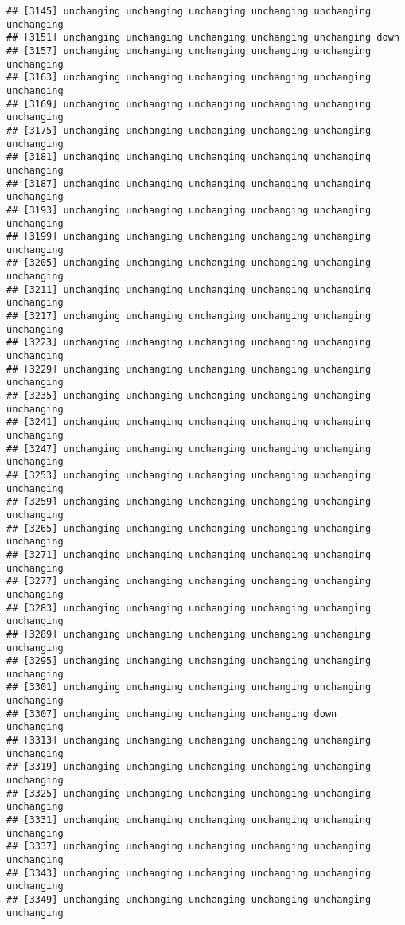 \documentclass[]{article}
\begin{document}
\begin{verbatim}
## [3145] unchanging unchanging unchanging unchanging unchanging unchanging
## [3151] unchanging unchanging unchanging unchanging unchanging down      
## [3157] unchanging unchanging unchanging unchanging unchanging unchanging
## [3163] unchanging unchanging unchanging unchanging unchanging unchanging
## [3169] unchanging unchanging unchanging unchanging unchanging unchanging
## [3175] unchanging unchanging unchanging unchanging unchanging unchanging
## [3181] unchanging unchanging unchanging unchanging unchanging unchanging
## [3187] unchanging unchanging unchanging unchanging unchanging unchanging
## [3193] unchanging unchanging unchanging unchanging unchanging unchanging
## [3199] unchanging unchanging unchanging unchanging unchanging unchanging
## [3205] unchanging unchanging unchanging unchanging unchanging unchanging
## [3211] unchanging unchanging unchanging unchanging unchanging unchanging
## [3217] unchanging unchanging unchanging unchanging unchanging unchanging
## [3223] unchanging unchanging unchanging unchanging unchanging unchanging
## [3229] unchanging unchanging unchanging unchanging unchanging unchanging
## [3235] unchanging unchanging unchanging unchanging unchanging unchanging
## [3241] unchanging unchanging unchanging unchanging unchanging unchanging
## [3247] unchanging unchanging unchanging unchanging unchanging unchanging
## [3253] unchanging unchanging unchanging unchanging unchanging unchanging
## [3259] unchanging unchanging unchanging unchanging unchanging unchanging
## [3265] unchanging unchanging unchanging unchanging unchanging unchanging
## [3271] unchanging unchanging unchanging unchanging unchanging unchanging
## [3277] unchanging unchanging unchanging unchanging unchanging unchanging
## [3283] unchanging unchanging unchanging unchanging unchanging unchanging
## [3289] unchanging unchanging unchanging unchanging unchanging unchanging
## [3295] unchanging unchanging unchanging unchanging unchanging unchanging
## [3301] unchanging unchanging unchanging unchanging unchanging unchanging
## [3307] unchanging unchanging unchanging unchanging down       unchanging
## [3313] unchanging unchanging unchanging unchanging unchanging unchanging
## [3319] unchanging unchanging unchanging unchanging unchanging unchanging
## [3325] unchanging unchanging unchanging unchanging unchanging unchanging
## [3331] unchanging unchanging unchanging unchanging unchanging unchanging
## [3337] unchanging unchanging unchanging unchanging unchanging unchanging
## [3343] unchanging unchanging unchanging unchanging unchanging unchanging
## [3349] unchanging unchanging unchanging unchanging unchanging unchanging

\end{verbatim}
\end{document}
